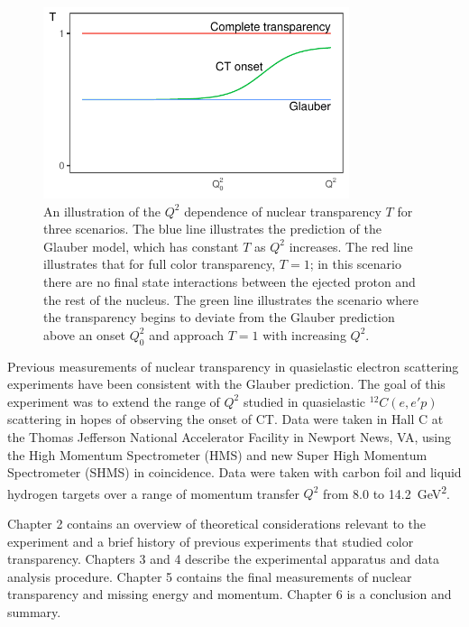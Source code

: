 \begin{figure}[!h]
    \centering
    \includegraphics[width=0.8\textwidth]{chap1/CT_toy_prediction.pdf}
    \caption{
            An illustration of the $Q^2$ dependence of nuclear transparency $T$
            for three scenarios.
            The blue line illustrates the prediction of the Glauber model,
            which has constant $T$ as $Q^2$ increases.
            The red line illustrates that for full color transparency, $T=1$;
            in this scenario there are no final state interactions between the
            ejected proton and the rest of the nucleus.
            The green line illustrates the scenario where the transparency
            begins to deviate from the Glauber prediction above an onset
            $Q_0^2$ and approach $T=1$ with increasing $Q^2$.
            }
    \label{fig:CT_toy_prediction}
\end{figure}

Previous measurements of nuclear transparency in quasielastic electron
scattering experiments have been consistent with the Glauber prediction.
The goal of this experiment was to extend the range of $Q^2$ studied
in quasielastic ${}^12C(e,e'p)$ scattering in hopes of observing the onset
of CT.
Data were taken in Hall C at the Thomas Jefferson National Accelerator Facility
in Newport News, VA, using the High Momentum Spectrometer (HMS) and new Super
High Momentum Spectrometer (SHMS) in coincidence.
Data were taken with carbon foil and liquid hydrogen targets over a range of
momentum transfer $Q^2$ from 8.0 to \SI{14.2}{\giga\electronvolt\squared}.


Chapter 2 contains an overview of theoretical considerations relevant to
the experiment and a brief history of previous experiments that studied color
transparency.
Chapters 3 and 4 describe the experimental apparatus and data analysis
procedure.
Chapter 5 contains the final measurements of nuclear transparency and missing
energy and momentum.
Chapter 6 is a conclusion and summary.
